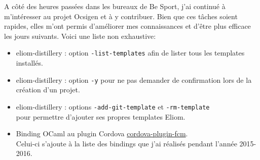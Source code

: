 A côté des heures passées dans les bureaux de Be Sport, j'ai continué à
m'intéresser au projet Ocsigen et à y contribuer. Bien que ces tâches soient
rapides, elles m'ont permis d'améliorer mes connaissances et d'être plus efficace
les jours suivants. Voici une liste non exhaustive:
\begin{itemize}
  \item eliom-distillery : option \verb|-list-templates| afin de lister tous les templates installés.
  \item eliom-distillery : option \verb|-y| pour ne pas demander de confirmation lors
    de la création d'un projet.
  \item eliom-distillery : options \verb|-add-git-template| et
\verb|-rm-template| \\ pour permettre d'ajouter ses propres templates Eliom.\cite{eliom-distillery-repo}
  \item Binding OCaml au plugin Cordova
    \href{https://github.com/fechanique/cordova-plugin-fcm}{cordova-plugin-fcm}.\cite{ocaml-cordova-plugin-fcm} \\
    Celui-ci s'ajoute à la liste des bindings que j'ai réalisés pendant
l'année 2015-2016.\cite{ocaml-cordova-plugin-list}
\end{itemize}
